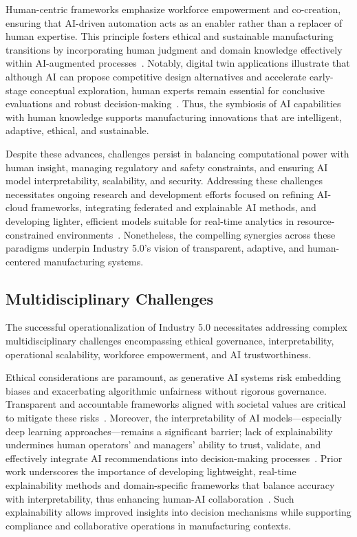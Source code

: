 \documentclass[sigconf]{acmart}
\begin{document}
Human-centric frameworks emphasize workforce empowerment and co-creation, ensuring that AI-driven automation acts as an enabler rather than a replacer of human expertise. This principle fosters ethical and sustainable manufacturing transitions by incorporating human judgment and domain knowledge effectively within AI-augmented processes~\cite{ref2}. Notably, digital twin applications illustrate that although AI can propose competitive design alternatives and accelerate early-stage conceptual exploration, human experts remain essential for conclusive evaluations and robust decision-making~\cite{ref2}. Thus, the symbiosis of AI capabilities with human knowledge supports manufacturing innovations that are intelligent, adaptive, ethical, and sustainable.

Despite these advances, challenges persist in balancing computational power with human insight, managing regulatory and safety constraints, and ensuring AI model interpretability, scalability, and security. Addressing these challenges necessitates ongoing research and development efforts focused on refining AI-cloud frameworks, integrating federated and explainable AI methods, and developing lighter, efficient models suitable for real-time analytics in resource-constrained environments~\cite{ref12}. Nonetheless, the compelling synergies across these paradigms underpin Industry 5.0’s vision of transparent, adaptive, and human-centered manufacturing systems.

\subsection{Multidisciplinary Challenges}

The successful operationalization of Industry 5.0 necessitates addressing complex multidisciplinary challenges encompassing ethical governance, interpretability, operational scalability, workforce empowerment, and AI trustworthiness.

Ethical considerations are paramount, as generative AI systems risk embedding biases and exacerbating algorithmic unfairness without rigorous governance. Transparent and accountable frameworks aligned with societal values are critical to mitigate these risks~\cite{ref2,ref41}. Moreover, the interpretability of AI models—especially deep learning approaches—remains a significant barrier; lack of explainability undermines human operators’ and managers’ ability to trust, validate, and effectively integrate AI recommendations into decision-making processes~\cite{ref30}. Prior work underscores the importance of developing lightweight, real-time explainability methods and domain-specific frameworks that balance accuracy with interpretability, thus enhancing human-AI collaboration~\cite{ref30}. Such explainability allows improved insights into decision mechanisms while supporting compliance and collaborative operations in manufacturing contexts.
\end{document}
